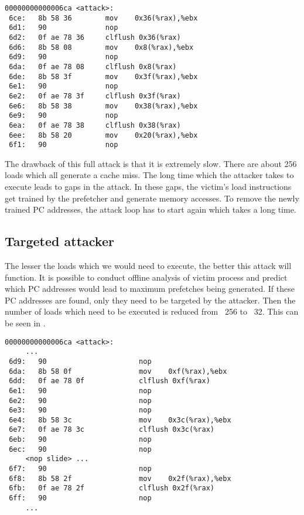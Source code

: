 \begin{lstlisting}[caption={Assembly showing load misses at different PCs},
label={lst:full_attack}]
00000000000006ca <attack>:
 6ce:   8b 58 36        mov    0x36(%rax),%ebx
 6d1:   90              nop
 6d2:   0f ae 78 36     clflush 0x36(%rax)
 6d6:   8b 58 08        mov    0x8(%rax),%ebx
 6d9:   90              nop
 6da:   0f ae 78 08     clflush 0x8(%rax)
 6de:   8b 58 3f        mov    0x3f(%rax),%ebx
 6e1:   90              nop
 6e2:   0f ae 78 3f     clflush 0x3f(%rax)
 6e6:   8b 58 38        mov    0x38(%rax),%ebx
 6e9:   90              nop
 6ea:   0f ae 78 38     clflush 0x38(%rax)
 6ee:   8b 58 20        mov    0x20(%rax),%ebx
 6f1:   90              nop
\end{lstlisting}

The drawback of this full attack is that it is extremely slow. There are about
256 loads which all generate a cache miss. The long time which the attacker
takes to execute leads to gaps in the attack. In these gaps, the victim's
load instructions get trained by the
prefetcher and generate memory accesses. To remove the newly trained PC addresses,
the attack loop has to start again which takes a long time.

\subsection{Targeted attacker}

The lesser the loads which we would need to execute, the better this attack will
function. It is possible to conduct offline analysis of victim process
and predict which PC addresses would lead to maximum prefetches being generated.
If these PC addresses are found, only they need to be targeted by the attacker.
Then the number of loads which need to be executed is reduced from ~256 to ~32.
This can be seen in .

\begin{lstlisting}[caption={Attacker targeting specific PC addresses},
label={lst:targeted_attack}]
00000000000006ca <attack>:
     ...
 6d9:   90                      nop
 6da:   8b 58 0f                mov    0xf(%rax),%ebx
 6dd:   0f ae 78 0f             clflush 0xf(%rax)
 6e1:   90                      nop
 6e2:   90                      nop
 6e3:   90                      nop
 6e4:   8b 58 3c                mov    0x3c(%rax),%ebx
 6e7:   0f ae 78 3c             clflush 0x3c(%rax)
 6eb:   90                      nop
 6ec:   90                      nop
     <nop slide> ...
 6f7:   90                      nop
 6f8:   8b 58 2f                mov    0x2f(%rax),%ebx
 6fb:   0f ae 78 2f             clflush 0x2f(%rax)
 6ff:   90                      nop
     ...
\end{lstlisting}

